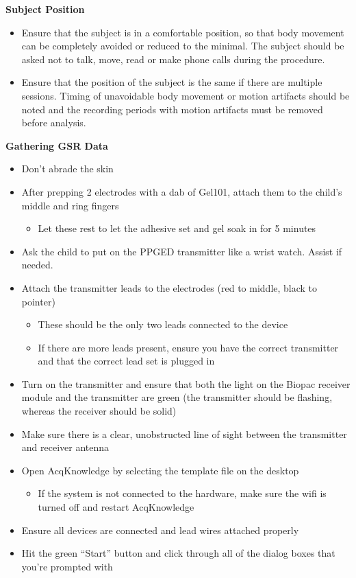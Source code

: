 \documentclass[
]{book}
\providecommand{\tightlist}{%
  \setlength{\itemsep}{0pt}\setlength{\parskip}{0pt}}
\begin{document}
\textbf{Subject Position}

\begin{itemize}
\tightlist
\item
  Ensure that the subject is in a comfortable position, so that body movement can be completely avoided or reduced to the minimal. The subject should be asked not to talk, move, read or make phone calls during the procedure.
\item
  Ensure that the position of the subject is the same if there are multiple sessions. Timing of unavoidable body movement or motion artifacts should be noted and the recording periods with motion artifacts must be removed before analysis.
\end{itemize}

\textbf{Gathering GSR Data}

\begin{itemize}
\tightlist
\item
  Don't abrade the skin
\item
  After prepping 2 electrodes with a dab of Gel101, attach them to the child's middle and ring fingers

  \begin{itemize}
  \tightlist
  \item
    Let these rest to let the adhesive set and gel soak in for 5 minutes
  \end{itemize}
\item
  Ask the child to put on the PPGED transmitter like a wrist watch. Assist if needed.
\item
  Attach the transmitter leads to the electrodes (red to middle, black to pointer)

  \begin{itemize}
  \tightlist
  \item
    These should be the only two leads connected to the device
  \item
    If there are more leads present, ensure you have the correct transmitter and that the correct lead set is plugged in
  \end{itemize}
\item
  Turn on the transmitter and ensure that both the light on the Biopac receiver module and the transmitter are green (the transmitter should be flashing, whereas the receiver should be solid)
\item
  Make sure there is a clear, unobstructed line of sight between the transmitter and receiver antenna
\item
  Open AcqKnowledge by selecting the template file on the desktop

  \begin{itemize}
  \tightlist
  \item
    If the system is not connected to the hardware, make sure the wifi is turned off and restart AcqKnowledge
  \end{itemize}
\item
  Ensure all devices are connected and lead wires attached properly
\item
  Hit the green ``Start'' button and click through all of the dialog boxes that you're prompted with
\end{itemize}
\end{document}
